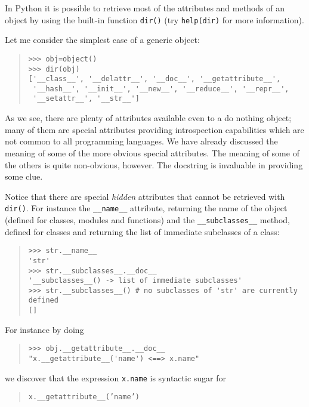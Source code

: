 \documentclass[10pt,english]{article}
\begin{document}
In Python it is possible to retrieve most of the attributes and methods 
of an object by using the built-in function \texttt{dir()}
(try \texttt{help(dir)} for more information).

Let me consider the simplest case of a generic object:
\begin{quote}
\begin{verbatim}>>> obj=object()
>>> dir(obj)
['__class__', '__delattr__', '__doc__', '__getattribute__', 
 '__hash__', '__init__', '__new__', '__reduce__', '__repr__', 
 '__setattr__', '__str__']\end{verbatim}
\end{quote}

As we see, there are plenty of attributes available
even to a do nothing object; many of them are special attributes
providing introspection capabilities which are not 
common to all programming languages. We have already discussed the
meaning of some of the more obvious special attributes.
The meaning of some of  the others is quite non-obvious, however.
The docstring is invaluable in providing some clue.

Notice that  there are special \emph{hidden} attributes that cannot be retrieved
with \texttt{dir()}. For instance the \texttt{{\_}{\_}name{\_}{\_}} attribute, returning the 
name of the object (defined for classes, modules and functions) 
and the \texttt{{\_}{\_}subclasses{\_}{\_}} method, defined for classes and returning the 
list of immediate subclasses of a class:
\begin{quote}
\begin{verbatim}>>> str.__name__
'str'
>>> str.__subclasses__.__doc__
'__subclasses__() -> list of immediate subclasses'
>>> str.__subclasses__() # no subclasses of 'str' are currently defined
[]\end{verbatim}
\end{quote}

For instance by doing
\begin{quote}
\begin{verbatim}>>> obj.__getattribute__.__doc__
"x.__getattribute__('name') <==> x.name"\end{verbatim}
\end{quote}

we discover that the expression \texttt{x.name} is syntactic sugar for
\begin{quote}

\texttt{x.{\_}{\_}getattribute{\_}{\_}('name')}
\end{quote}
\end{document}
